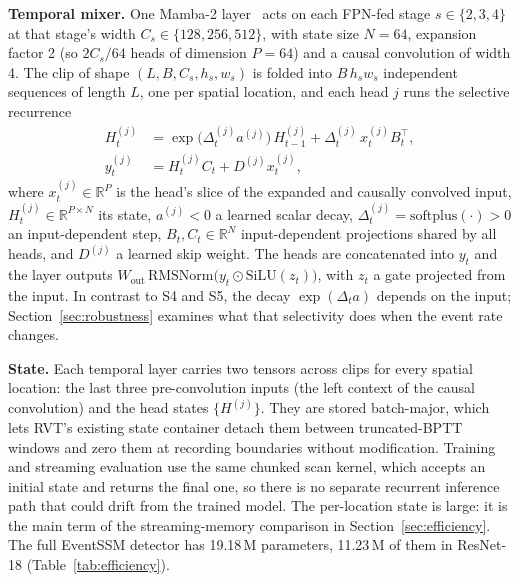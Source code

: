 \documentclass[11pt, a4paper]{report}
\begin{document}
\textbf{Temporal mixer.} One Mamba-2 layer~\cite{dao2024transformers} acts on each FPN-fed stage
$s\in\{2,3,4\}$ at that stage's width $C_s\in\{128,256,512\}$, with state size $N=64$, expansion factor 2
(so $2C_s/64$ heads of dimension $P=64$) and a causal convolution of width 4. The clip of shape
$(L, B, C_s, h_s, w_s)$ is folded into $B\,h_s w_s$ independent sequences of length $L$, one per spatial
location, and each head $j$ runs the selective recurrence
\begin{align}
  H^{(j)}_t &= \exp\!\big(\Delta^{(j)}_t a^{(j)}\big)\, H^{(j)}_{t-1} + \Delta^{(j)}_t\, x^{(j)}_t B_t^{\top},
  \label{eq:mamba2_state}\\
  y^{(j)}_t &= H^{(j)}_t C_t + D^{(j)} x^{(j)}_t,
  \label{eq:mamba2_out}
\end{align}
where $x^{(j)}_t\in\mathbb{R}^{P}$ is the head's slice of the expanded and causally convolved input,
$H^{(j)}_t\in\mathbb{R}^{P\times N}$ its state, $a^{(j)}<0$ a learned scalar decay,
$\Delta^{(j)}_t=\mathrm{softplus}(\cdot)>0$ an input-dependent step, $B_t, C_t\in\mathbb{R}^{N}$
input-dependent projections shared by all heads, and $D^{(j)}$ a learned skip weight. The heads are
concatenated into $y_t$ and the layer outputs $W_{\mathrm{out}}\,\mathrm{RMSNorm}\big(y_t\odot\mathrm{SiLU}(z_t)\big)$,
with $z_t$ a gate projected from the input. In contrast to S4 and S5, the decay
$\exp(\Delta_t a)$ depends on the input; Section~\ref{sec:robustness} examines what that selectivity does
when the event rate changes.

\textbf{State.} Each temporal layer carries two tensors across clips for every spatial location: the
last three pre-convolution inputs (the left context of the causal convolution) and the head states
$\{H^{(j)}\}$. They are stored batch-major, which lets RVT's existing state container detach them between
truncated-BPTT windows and zero them at recording boundaries without modification. Training and
streaming evaluation use the same chunked scan kernel, which accepts an initial state and returns the
final one, so there is no separate recurrent inference path that could drift from the trained model.
The per-location state is large: it is the main term of the streaming-memory comparison in
Section~\ref{sec:efficiency}. The full EventSSM detector has 19.18\,M parameters, 11.23\,M of them in
ResNet-18 (Table~\ref{tab:efficiency}).
\end{document}
